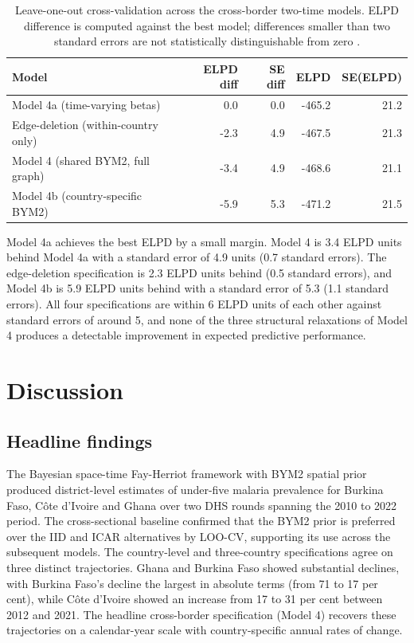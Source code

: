 \documentclass{article}
\begin{document}
\begin{longtable}[t]{lrrrr}
\caption{\label{tab:sens-loo}Leave-one-out cross-validation across the cross-border two-time models. ELPD difference is computed against the best model; differences smaller than two standard errors are not statistically distinguishable from zero \citep{vehtari2017}. \label{tab:sens-loo}}\\
\toprule
Model & ELPD diff & SE diff & ELPD & SE(ELPD)\\
\midrule
Model 4a (time-varying betas) & 0.0 & 0.0 & -465.2 & 21.2\\
Edge-deletion (within-country only) & -2.3 & 4.9 & -467.5 & 21.3\\
Model 4 (shared BYM2, full graph) & -3.4 & 4.9 & -468.6 & 21.1\\
Model 4b (country-specific BYM2) & -5.9 & 5.3 & -471.2 & 21.5\\
\bottomrule
\end{longtable}
\endgroup{}

Model 4a achieves the best ELPD by a small margin. Model 4 is 3.4 ELPD
units behind Model 4a with a standard error of 4.9 units (0.7 standard
errors). The edge-deletion specification is 2.3 ELPD units behind (0.5
standard errors), and Model 4b is 5.9 ELPD units behind with a standard
error of 5.3 (1.1 standard errors). All four specifications are within 6
ELPD units of each other against standard errors of around 5, and none
of the three structural relaxations of Model 4 produces a detectable
improvement in expected predictive performance.

\section{Discussion}\label{discussion}

\label{sec:discussion}

\subsection{Headline findings}\label{headline-findings}

The Bayesian space-time Fay-Herriot framework with BYM2 spatial prior
produced district-level estimates of under-five malaria prevalence for
Burkina Faso, Côte d'Ivoire and Ghana over two DHS rounds spanning the
2010 to 2022 period. The cross-sectional baseline confirmed that the
BYM2 prior is preferred over the IID and ICAR alternatives by LOO-CV,
supporting its use across the subsequent models. The country-level and
three-country specifications agree on three distinct trajectories. Ghana
and Burkina Faso showed substantial declines, with Burkina Faso's
decline the largest in absolute terms (from 71 to 17 per cent), while
Côte d'Ivoire showed an increase from 17 to 31 per cent between 2012 and
2021. The headline cross-border specification (Model 4) recovers these
trajectories on a calendar-year scale with country-specific annual rates
of change.
\end{document}
